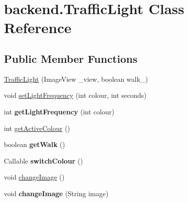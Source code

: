 \hypertarget{classbackend_1_1_traffic_light}{}\section{backend.\+Traffic\+Light Class Reference}
\label{classbackend_1_1_traffic_light}
\subsection*{Public Member Functions}
\begin{DoxyCompactItemize}
\item 
\hyperlink{classbackend_1_1_traffic_light_a68941f8d3b0bbff67b69f3c189d77788}{Traffic\+Light} (Image\+View \+\_\+view, boolean walk\+\_\+)
\item 
void \hyperlink{classbackend_1_1_traffic_light_a4dfc82eed9125fee41834447918ecafe}{set\+Light\+Frequency} (int colour, int seconds)
\item 
int {\bfseries get\+Light\+Frequency} (int colour)\hypertarget{classbackend_1_1_traffic_light_afb34bdb3be2f60a76111ed774480ae01}{}\label{classbackend_1_1_traffic_light_afb34bdb3be2f60a76111ed774480ae01}

\item 
int \hyperlink{classbackend_1_1_traffic_light_a2d0231e3f47fa1003d43069d2dfbf7ec}{get\+Active\+Colour} ()
\item 
boolean {\bfseries get\+Walk} ()\hypertarget{classbackend_1_1_traffic_light_a51494a57afd2d10a8791d29b79540b27}{}\label{classbackend_1_1_traffic_light_a51494a57afd2d10a8791d29b79540b27}

\item 
Callable {\bfseries switch\+Colour} ()\hypertarget{classbackend_1_1_traffic_light_a704ee3bbe733ce6e0e4fbedc9f0794bd}{}\label{classbackend_1_1_traffic_light_a704ee3bbe733ce6e0e4fbedc9f0794bd}

\item 
void \hyperlink{classbackend_1_1_traffic_light_a3189b2b6440789c714bb004cb792d452}{change\+Image} ()
\item 
void {\bfseries change\+Image} (String image)\hypertarget{classbackend_1_1_traffic_light_a353a1c82eadb571e4b982dcab075d2d4}{}\label{classbackend_1_1_traffic_light_a353a1c82eadb571e4b982dcab075d2d4}


\end{DoxyCompactItemize}
